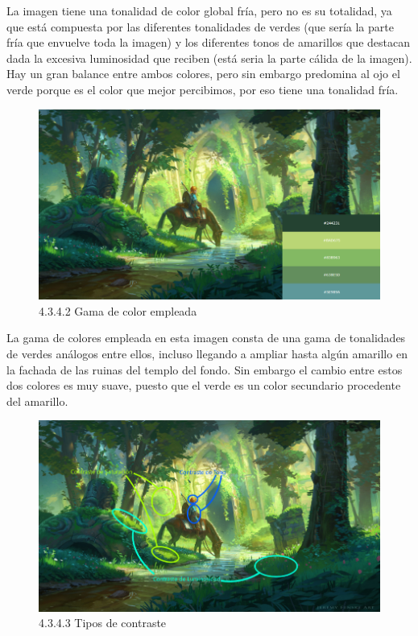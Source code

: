 \documentclass[12pt]{article}
\begin{document}
La imagen tiene una tonalidad de color global fría, pero no es su totalidad, ya que está compuesta por las diferentes tonalidades de verdes (que sería la parte fría que envuelve toda la imagen) y los diferentes tonos de amarillos que destacan dada la excesiva luminosidad que reciben (está seria la parte cálida de la imagen). Hay un gran balance entre ambos colores, pero sin embargo predomina al ojo el verde porque es el color que mejor percibimos, por eso tiene una tonalidad fría.

    \begin{figure}[H]
      \centering
      \includegraphics[scale=0.7]{images/Saúl/Sección 3/EA_img3_4Color_2GamaColores.png}
      \caption{\small 4.3.4.2 Gama de color empleada}
    \end{figure}

La gama de colores empleada en esta imagen consta de una gama de tonalidades de verdes análogos entre ellos, incluso llegando a ampliar hasta algún amarillo en la fachada de las ruinas del templo del fondo. Sin embargo el cambio entre estos dos colores es muy suave, puesto que el verde es un color secundario procedente del amarillo.

    \begin{figure}[H]
      \centering
      \includegraphics[scale=0.7]{images/Saúl/Sección 3/EA_img3_4Color_3Contrastes.png}
      \caption{\small 4.3.4.3 Tipos de contraste}
    \end{figure}
\end{document}
